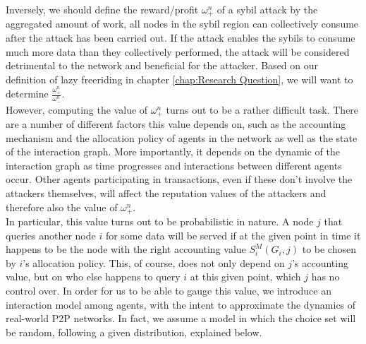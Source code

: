 \noindent{}Inversely, we should define the reward/profit $\omega_{+}^{n}$ of a sybil attack by the aggregated amount of work, all nodes in the sybil region can collectively consume after the attack has been carried out. If the attack enables the sybils to consume much more data than they collectively performed, the attack will be considered detrimental to the network and beneficial for the attacker. Based on our definition of lazy freeriding in chapter \ref{chap:Research Question}, we will want to determine $\frac{\omega_{+}^{n}}{\omega_{-}^{n}}$. \vspace{1em}\\

\noindent{}However, computing the value of $\omega_{+}^{n}$ turns out to be a rather difficult task. There are a number of different factors this value depends on, such as the accounting mechanism and the allocation policy of agents in the network as well as the state of the interaction graph. More importantly, it depends on the dynamic of the interaction graph as time progresses and interactions between different agents occur. Other agents participating in transactions, even if these don't involve the attackers themselves, will affect the reputation values of the attackers and therefore also the value of $\omega_{+}^{n}$. \vspace{1em}\\

\noindent{}In particular, this value turns out to be probabilistic in nature. A node $j$ that queries another node $i$ for some data will be served if at the given point in time it happens to be the node with the right accounting value $S^M_i(G_i,j)$ to be chosen by $i$'s allocation policy. This, of course, does not only depend on $j$'s accounting value, but on who else happens to query $i$ at this given point, which $j$ has no control over. In order for us to be able to gauge this value, we introduce an interaction model among agents, with the intent to approximate the dynamics of real-world P2P networks. In fact, we assume a model in which the choice set will be random, following a given distribution, explained below.  \vspace{1em}\\


